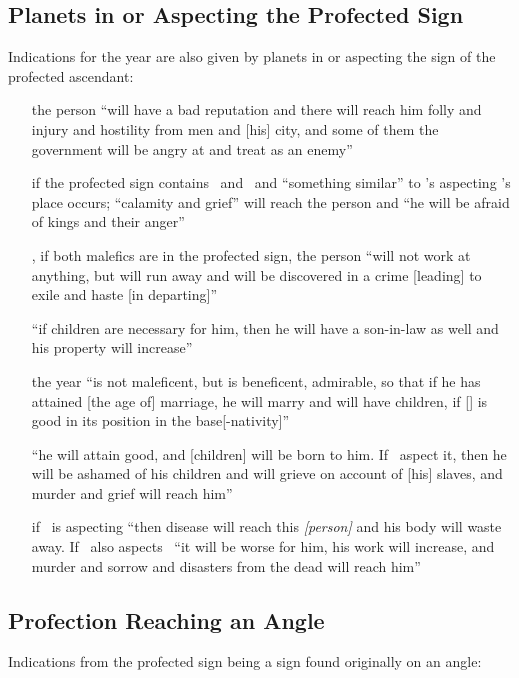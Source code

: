 \subsection{Planets in or Aspecting the Profected Sign}
Indications for the year are also given by planets in or aspecting the sign of the profected ascendant:
\begin{itemize}[topsep=0em,itemsep=0em]
\item[\Saturn]  the person ``will have a bad reputation and there will reach him folly and injury and hostility from men and [his] city, and some of them the government will be angry at and treat as an enemy'' 

\item[\Mars]  if the profected sign contains \Mars\, and \Saturn\, and ``something similar'' to \Mars's aspecting \Saturn's place occurs; ``calamity and grief'' will reach the person and ``he will be afraid of kings and their anger''

\item[\Saturn,\Mars]  if both malefics are in the profected sign, the person ``will not work at anything, but will run away and will be discovered in a crime [leading] to exile and haste [in departing]''

\item[\Jupiter]  ``if children are necessary for him, then he will have a son-in-law as well and his property will increase''

\item[\Venus]  the year ``is not maleficent, but is beneficent, admirable, so that if he has attained [the age of] marriage, he will marry and will have children, if [\Venus] is good in its position in the base[-nativity]''

\item[\Mercury]  ``he will attain good, and [children] will be born to him. If \Saturn\, aspect it, then he will be ashamed of his children and will grieve on account of [his] slaves, and murder and grief will reach him''

\item[\Moon]  if \Saturn\, is aspecting ``then disease will reach this \textsl{[person]} and his body will waste away. If \Mercury\, also aspects \Saturn\, ``it will be worse for him, his work will increase, and murder and sorrow and disasters from the dead will reach him''
\end{itemize}

\subsection{Profection Reaching an Angle}
Indications from the profected sign being a sign found originally on an angle:

